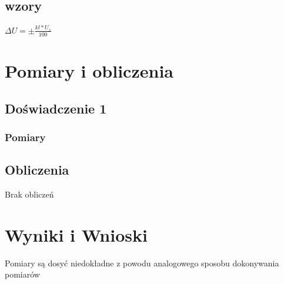 \documentclass{article}  %
\begin{document}
        \subsection{wzory}
            $\Delta U = \pm \frac{kl \ast U_z}{100}$

    \section{Pomiary i obliczenia}
        \subsection{Doświadczenie 1}
            
            \subsubsection{Pomiary}
                \begin{table}[H]
                    \centering
                \end{table}
        \subsection{Obliczenia}
            Brak obliczeń
    \section{Wyniki i Wnioski}
    Pomiary są dosyć niedokładne z powodu analogowego sposobu dokonywania pomiarów
\end{document}

